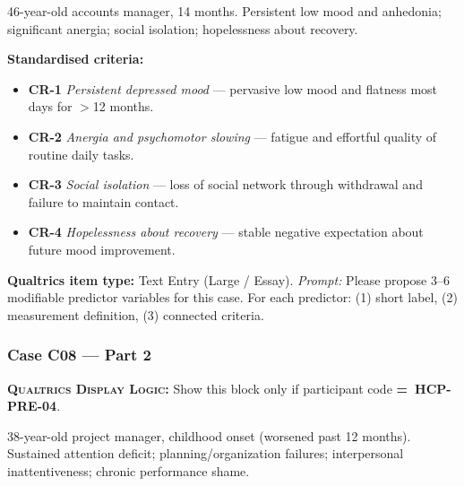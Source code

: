 \documentclass[11pt,a4paper]{article}
\newcommand{\responsetextarea}[1]{\begin{tcolorbox}[colback=ResponseBG,colframe=GoldAmber,boxrule=0.6pt,arc=1.5mm,left=6pt,right=6pt,top=5pt,bottom=5pt]\small\textbf{\color{GoldAmber}Qualtrics item type:} Text Entry (Large / Essay). \quad \textit{Prompt:} #1\end{tcolorbox}}
\newcommand{\dlnote}[1]{\par\vspace{0.15em}\noindent\begin{tcolorbox}[colback=AccentAmber,colframe=GoldAmber,boxrule=0.45pt,arc=1mm,left=5pt,right=5pt,top=2.5pt,bottom=2.5pt]\footnotesize\textbf{\color{GoldAmber}\scshape Qualtrics Display Logic:} Show this block only if participant code \textbf{=~#1}.\end{tcolorbox}\vspace{0.1em}}
\begin{document}
\begin{complaintbox}[title=Case C07 --- Complaint (abbreviated)]
\small 46-year-old accounts manager, 14 months. Persistent low mood and anhedonia; significant anergia; social isolation; hopelessness about recovery.
\end{complaintbox}

\begin{contextbox}
\small\textbf{Standardised criteria:}
\begin{itemize}[topsep=2pt,itemsep=1pt]
\item \textbf{CR-1} \textit{Persistent depressed mood} --- pervasive low mood and flatness most days for $>$12 months.
\item \textbf{CR-2} \textit{Anergia and psychomotor slowing} --- fatigue and effortful quality of routine daily tasks.
\item \textbf{CR-3} \textit{Social isolation} --- loss of social network through withdrawal and failure to maintain contact.
\item \textbf{CR-4} \textit{Hopelessness about recovery} --- stable negative expectation about future mood improvement.
\end{itemize}
\end{contextbox}

\responsetextarea{Please propose 3--6 modifiable predictor variables for this case. For each predictor: (1) short label, (2) measurement definition, (3) connected criteria.}

\vspace{0.4em}

\subsubsection*{Case C08 --- Part 2}
\dlnote{HCP-PRE-04}

\begin{complaintbox}[title=Case C08 --- Complaint (abbreviated)]
\small 38-year-old project manager, childhood onset (worsened past 12 months). Sustained attention deficit; planning/organization failures; interpersonal inattentiveness; chronic performance shame.
\end{complaintbox}
\end{document}

